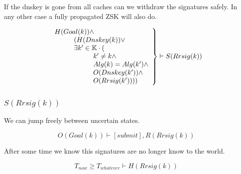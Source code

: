 \documentclass[twoside,english, a4paper]{article}
\newcommand{\mathbox}[1]{#1}
\begin{document}
\mathbox{

	If the dnskey is gone from all caches can we withdraw the 
	signatures safely. In any other case a fully propagated ZSK will 
	also do.

	\begin{equation}
		\left.
		\begin{array}{l}
\hskip 0cm			H(Goal(k)) \wedge  \\
\hskip 1cm			(H(Dnskey(k)) \vee \\
\hskip 1cm			\exists k' \in \mathbb{K} \cdot ( \\
\hskip 2cm				k' \not = k  \wedge\\
\hskip 2cm				Alg(k) = Alg(k')  \wedge\\
\hskip 2cm				O(Dnskey(k'))  \wedge\\
\hskip 2cm				O(Rrsig(k'))))
		\end{array}
		\right\} \vdash S(Rrsig(k))
	\end{equation}
}

\subsubsection{$S(Rrsig(k))$}

\mathbox{

	We can jump freely between uncertain states.

	\begin{equation}
		O(Goal(k)) \vdash [submit], R(Rrsig(k))
	\end{equation}

	After some time we know this signatures are no longer know to the
	world.
	
	\begin{equation}
		T_{now} \geq T_{whatever} \vdash H(Rrsig(k))
	\end{equation}
}
\end{document}
